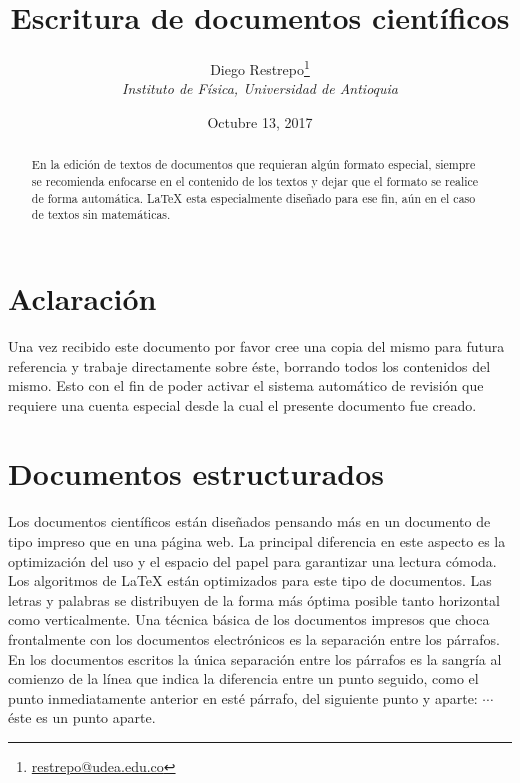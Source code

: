 \documentclass{article}
\title{Escritura de documentos científicos}
\author{Diego Restrepo\footnote{\href{mailto:restrepo@udea.edu.co}{restrepo@udea.edu.co}}\\
\textit{\small  Instituto de Física, Universidad de Antioquia}
}
\date{\small Octubre 13, 2017}
\begin{document}



\maketitle

\begin{abstract}
En la edición de textos de documentos que requieran algún formato
especial, siempre se recomienda enfocarse en el contenido de los textos y
dejar que el formato se realice de forma automática. \LaTeX{} esta especialmente diseñado para ese fin, aún en el caso de textos sin matemáticas.
\end{abstract}
\section{Aclaración}
Una vez recibido este documento por favor cree una copia del mismo para futura referencia y trabaje directamente sobre éste, borrando todos los contenidos del mismo. Esto con el fin de poder activar el sistema automático de revisión que requiere una cuenta especial desde la cual el presente documento fue creado. 
\section{Documentos estructurados}
Los documentos científicos están diseñados pensando más en un documento de tipo impreso que en una página web. La principal diferencia en este aspecto es la optimización del uso y el espacio del papel para garantizar una lectura cómoda. Los algoritmos de \LaTeX{} están optimizados para este tipo de documentos. Las letras y palabras se distribuyen de la forma más óptima posible tanto horizontal como verticalmente. Una técnica básica de los documentos impresos que choca frontalmente con los documentos electrónicos es la separación entre los párrafos. En los documentos escritos la única separación entre los párrafos es la sangría al comienzo de la línea que indica la diferencia entre un punto seguido, como el punto inmediatamente anterior en esté párrafo, del siguiente punto y aparte:  $\cdots$ \hfill éste es un punto aparte.
\end{document}
